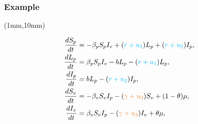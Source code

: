 %
\begin{frame}[plain]
\frametitle{Example}
    {
        \begin{textblock*}{70mm}(1mm,10mm)
            \begin{greenbox}{}
                \begin{align*}
                    \frac{dS_p}{dt} &=
                    -\beta_p S_p I_v +(\textcolor{capri}{r 
                    +u_1})L_p + 
                    (\textcolor{capri}{r + u_2}) I_p,
                    \\
                    \frac{dL_p}{dt} &=
                    \beta_p S_p I_v -b L_p 
                    -(\textcolor{capri}{r + u_1})L_p,
                    \\
                    \frac{dI_p}{dt} &= 
                    b L_p - (\textcolor{capri}{r + u_2}) I_p,
                    \\
                    \frac{dS_v}{dt} &=
                    -\beta_v S_v I_p 
                    - (\textcolor{cadmiumorange}{\gamma+u_3}) 
                    S_v 
                        +(1-\theta)\mu,
                    \\
                    \frac{dI_v}{dt} &=
                    \beta_v S_v I_p 
                    -(\textcolor{cadmiumorange}{\gamma+u_3}) 
                    I_v 
                    +\theta\mu,
                \end{align*}
            \end{greenbox}
        \end{textblock*}
    }
\end{frame}
